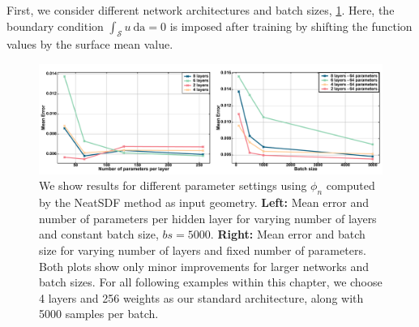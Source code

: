 \documentclass[12pt,openany]{book}
\def\S{\mathcal{S}}
\theoremstyle{plainnormal}
\theoremstyle{remark}
\begin{document}
First, we consider different network architectures and batch sizes, \cref{poisson_diff_bs}. Here, the boundary condition $\int_\S u\ \mathrm{da} = 0$ is imposed after training by shifting the function values by the surface mean value. \par 
 \begin{figure}
    \centering
    \includegraphics[width=\textwidth]{Figures/pot_combined2.pdf}
    
    \caption{We show results for different parameter settings using $\phi_n$ computed by the NeatSDF method as input geometry. \textbf{Left:} Mean error and number of parameters per hidden layer for varying number of layers and constant batch size, $bs = 5000$. 
     \textbf{Right:} Mean error and batch size for varying number of layers and fixed number of parameters. Both plots show only minor improvements for larger networks and batch sizes. For all following examples within this chapter, we choose 4 layers and 256 weights as our standard architecture, along with 5000 samples per batch.}
    \label{poisson_diff_bs}
    \end{figure}
 
\end{document}
